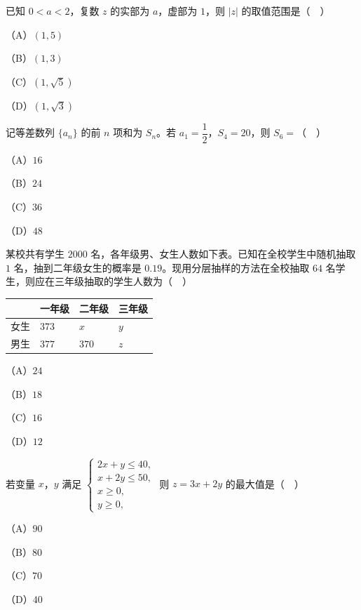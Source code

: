 


\begin{question}
已知 $0<a<2$，复数 $z$ 的实部为 $a$，虚部为 $1$，则 $|z|$ 的取值范围是（　）

（A）$(1,5)$

（B）$(1,3)$

（C）$(1,\sqrt5)$

（D）$(1,\sqrt3)$

\end{question}
\begin{question}
记等差数列 $\{a_n\}$ 的前 $n$ 项和为 $S_n$。若 $a_1=\dfrac12$，$S_4=20$，则 $S_6=$（　）

（A）$16$

（B）$24$

（C）$36$

（D）$48$

\end{question}
\begin{question}
某校共有学生 $2000$ 名，各年级男、女生人数如下表。已知在全校学生中随机抽取 $1$ 名，抽到二年级女生的概率是 $0.19$。现用分层抽样的方法在全校抽取 $64$ 名学生，则应在三年级抽取的学生人数为（　）

\begin{center}
\begin{tabular}{llll}
\toprule
 & 一年级 & 二年级 & 三年级 \\
\midrule
女生 & $373$ & $x$ & $y$ \\
男生 & $377$ & $370$ & $z$ \\
\bottomrule
\end{tabular}
\end{center}

（A）$24$

（B）$18$

（C）$16$

（D）$12$

\end{question}
\begin{question}
若变量 $x$，$y$ 满足 $\begin{cases}2x+y\leqslant40,\\ x+2y\leqslant50,\\ x\geqslant0,\\ y\geqslant0,\end{cases}$ 则 $z=3x+2y$ 的最大值是（　）

（A）$90$

（B）$80$

（C）$70$

（D）$40$

\Needspace{0.4\textheight}
\end{question}
